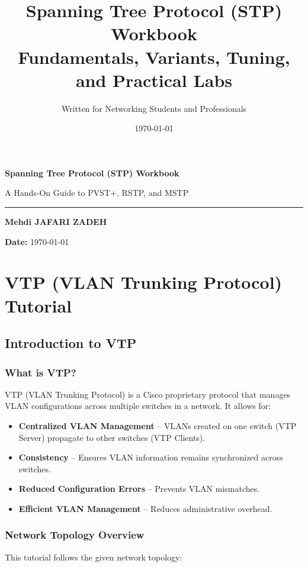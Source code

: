 \documentclass[a4paper]{book}
\title{\Huge \textbf{Spanning Tree Protocol (STP) Workbook}\\
       \Large Fundamentals, Variants, Tuning, and Practical Labs}
\author{\Large Written for Networking Students and Professionals}
\date{\today}
\begin{document}
\begin{titlepage}
    \centering
    \vspace*{4cm}
    {\Huge \textbf{Spanning Tree Protocol (STP) Workbook}\par}
    \vspace{0.8cm}
    {\Large A Hands-On Guide to PVST+, RSTP, and MSTP\par}
    \vspace{0.3cm}
    \rule{0.9\textwidth}{1pt}
    
    \vspace{0.6cm}
    {\large \textbf{Mehdi JAFARI ZADEH}}\par
    \vspace{0.3cm}

    
    \vfill
    \textbf{Date:} \today
    \vspace{2cm}
\end{titlepage}

\tableofcontents

\chapter{VTP (VLAN Trunking Protocol) Tutorial}

\section{Introduction to VTP}
\subsection{What is VTP?}
VTP (VLAN Trunking Protocol) is a Cisco proprietary protocol that manages VLAN configurations across multiple switches in a network. It allows for:
\begin{itemize}
    \item \textbf{Centralized VLAN Management} – VLANs created on one switch (VTP Server) propagate to other switches (VTP Clients).
    \item \textbf{Consistency} – Ensures VLAN information remains synchronized across switches.
    \item \textbf{Reduced Configuration Errors} – Prevents VLAN mismatches.
    \item \textbf{Efficient VLAN Management} – Reduces administrative overhead.
\end{itemize}

\subsection{Network Topology Overview}
This tutorial follows the given network topology:
\end{document}
